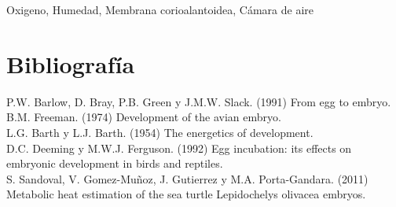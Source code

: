 \documentclass{article}
\begin{document}
	Oxigeno, Humedad, Membrana corioalantoidea, Cámara de aire
		
	\section{Bibliografía}
	
	P.W. Barlow, D. Bray, P.B. Green y J.M.W. Slack. (1991) From egg to embryo.\\
	B.M. Freeman. (1974) Development of the avian embryo.\\
	L.G. Barth y L.J. Barth. (1954) The energetics of development.\\
	D.C. Deeming y M.W.J. Ferguson. (1992) Egg incubation: its effects on embryonic development in birds and reptiles.\\
	S. Sandoval, V. Gomez-Muñoz, J. Gutierrez y M.A. Porta-Gandara. (2011) Metabolic heat estimation of the sea turtle Lepidochelys olivacea embryos.\\
	
	
\end{document}
